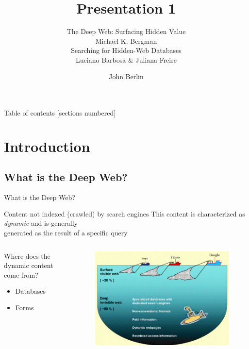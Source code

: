 \documentclass{beamer}
\author{John Berlin}
\subtitle{
\normalsize{The Deep Web: Surfacing Hidden Value} \\  \footnotesize{Michael K. Bergman} \\ 
\normalsize{Searching for Hidden-Web Databases} \\ \footnotesize{Luciano Barbosa \& Juliana Freire}
}
\title{Presentation 1}
\institute{Old Dominion University \\ Introduction to Information Retrieval \\ CS734/834   }
\begin{document}
\maketitle

\begin{frame}{Table of contents}
  [sections numbered]
  \tableofcontents[hideallsubsections]
\end{frame}



\section{Introduction}
\subsection{What is the Deep Web?}

\begin{frame}[fragile]{What is the Deep Web?}
	\begin{block}{Content not indexed (\alert{crawled}) by search engines}
	This content is characterized as \emph{dynamic} and is generally \\
	generated as the result of a specific query
  \end{block}
   \begin{columns}[T,onlytextwidth]
		\begin{block}{Where does the dynamic content come from?}
			\begin{itemize}
     			  \item Databases
   				 \item Forms
  			\end{itemize}
  		\end{block}
  		\begin{figure}
			\includegraphics[scale=0.3]{invisible-web.gif}
		\end{figure}
  \end{columns}
\end{frame}
\end{document}
